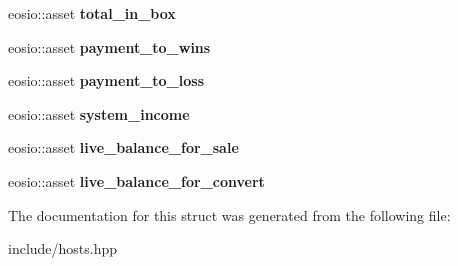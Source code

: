 \begin{DoxyCompactItemize}
\mbox{\label{structeosio_1_1rate_a6af57aef0a8c91f2472a64d53e93a791}} 
eosio\+::asset {\bfseries total\+\_\+in\+\_\+box}
\item 
\mbox{\label{structeosio_1_1rate_aedf100727a10ec7e8c79d5f15506f5f1}} 
eosio\+::asset {\bfseries payment\+\_\+to\+\_\+wins}
\item 
\mbox{\label{structeosio_1_1rate_afdbe58b4086a75bfcfab5f1c572b5ce8}} 
eosio\+::asset {\bfseries payment\+\_\+to\+\_\+loss}
\item 
\mbox{\label{structeosio_1_1rate_a72eadaf4f9053b0c23dae37600854503}} 
eosio\+::asset {\bfseries system\+\_\+income}
\item 
\mbox{\label{structeosio_1_1rate_ad165d68d00b1c717205dbc971ae43206}} 
eosio\+::asset {\bfseries live\+\_\+balance\+\_\+for\+\_\+sale}
\item 
\mbox{\label{structeosio_1_1rate_a9ba520a9023be5bee260241412e0dc7b}} 
eosio\+::asset {\bfseries live\+\_\+balance\+\_\+for\+\_\+convert}
\end{DoxyCompactItemize}


The documentation for this struct was generated from the following file\+:\begin{DoxyCompactItemize}
\item 
include/hosts.\+hpp\end{DoxyCompactItemize}
